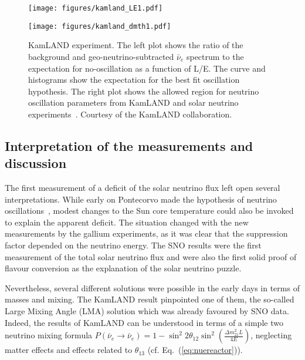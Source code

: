 \begin{figure}[htbp]
\begin{minipage}[c]{.46\linewidth}
   	      \texttt{[image: figures/kamland\_LE1.pdf]}
   \end{minipage} \hfill
   \begin{minipage}{.46\linewidth}
      \texttt{[image: figures/kamland\_dmth1.pdf]}
   \end{minipage}
    \caption{KamLAND experiment. The left plot shows the ratio of the background and geo-neutrino-subtracted $\bar{\nu}_e$
spectrum to the expectation for no-oscillation as a function of
L/E. The curve and histograms show the expectation for the best fit oscillation hypothesis. The right plot shows the allowed region for neutrino oscillation parameters from
KamLAND and solar neutrino experiments~\cite{Gando:2013nba}. Courtesy of the KamLAND collaboration.} 
 \label{fig:sol-kam}
\end{figure}


\subsection{Interpretation of the measurements and discussion}
\label{subsec:solarinter}

The first measurement of a deficit of the solar neutrino flux left open several interpretations. While early on Pontecorvo made the hypothesis of neutrino oscillations~\cite{Pontecorvo:1967fh}, modest changes to the Sun core temperature could also be invoked to explain the apparent deficit. 
The situation changed with the new measurements by the gallium experiments, as it was clear that the suppression factor depended on the neutrino energy. The SNO results were the first measurement of the total solar neutrino flux and were also the first solid proof of flavour conversion as the explanation of the solar neutrino puzzle. 

Nevertheless, several different solutions were possible in the early days in terms of masses and mixing. The KamLAND result pinpointed one of them, the so-called Large Mixing Angle (LMA) solution which was already favoured by SNO data. Indeed, the results of KamLAND can be understood in terms of a simple two neutrino mixing formula $ P(\bar{\nu}_e \rightarrow \bar{\nu}_e ) = 1 - \sin^2 2 \theta_{12} \sin^2 (\frac{\Delta m^2_{21} L}{4 E}) $, neglecting matter effects and effects related to $\theta_{13}$ (cf. Eq.~(\ref{eq:nuereactor})). 

